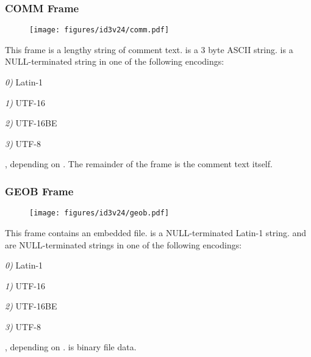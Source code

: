 \subsubsection{COMM Frame}
\begin{figure}[h]
\texttt{[image: figures/id3v24/comm.pdf]}
\end{figure}
This frame is a lengthy string of comment text.
 is a 3 byte ASCII string.
 is a NULL-terminated string
in one of the following encodings:
\begin{inparaenum}
\item[\itshape 0\upshape)] Latin-1
\item[\itshape 1\upshape)] UTF-16
\item[\itshape 2\upshape)] UTF-16BE
\item[\itshape 3\upshape)] UTF-8
\end{inparaenum}
, depending on .
The remainder of the frame is the comment text itself.

\subsubsection{GEOB Frame}
\begin{figure}[h]
\texttt{[image: figures/id3v24/geob.pdf]}
\end{figure}
This frame contains an embedded file.
 is a NULL-terminated Latin-1 string.
 and  are NULL-terminated
strings in one of the following encodings:
\begin{inparaenum}
\item[\itshape 0\upshape)] Latin-1
\item[\itshape 1\upshape)] UTF-16
\item[\itshape 2\upshape)] UTF-16BE
\item[\itshape 3\upshape)] UTF-8
\end{inparaenum}
, depending on .
 is binary file data.

\clearpage


